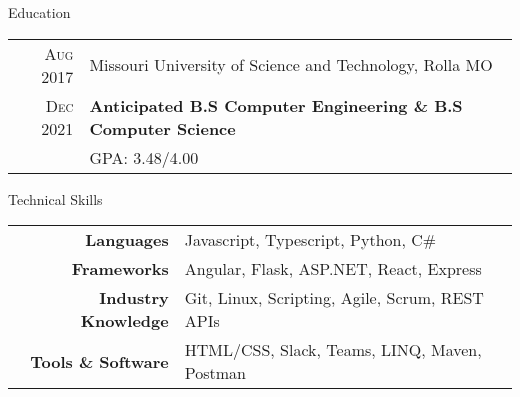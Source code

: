 \documentclass{resume}
\begin{document}

  
    
\begin{rSection}{Education}
  \small
  {
    \begin{tabular}{r|p{15cm}}
      \textsc{Aug} 2017 & Missouri University of Science and Technology, Rolla MO  \\ 
      \textsc{Dec} 2021 & \textbf{Anticipated B.S Computer Engineering \& B.S Computer Science} \\
      & GPA: 3.48/4.00 \\
    \end{tabular}
    }
\end{rSection}
      
\begin{rSection}{Technical Skills}
  \small
  {
      \begin{tabular}{rl}
      \multicolumn{1}{r|}{\textbf{Languages}} & Javascript, Typescript, Python, C\# \\
      \multicolumn{1}{r|}{\textbf{Frameworks}} & Angular, Flask, ASP.NET, React, Express \\
      \multicolumn{1}{r|}{\textbf{Industry Knowledge}} & Git, Linux, Scripting, Agile, Scrum, REST APIs \\
      \multicolumn{1}{r|}{\textbf{Tools \& Software}} & HTML/CSS, Slack, Teams, LINQ, Maven, Postman
      \end{tabular}
  }
\end{rSection}
\end{document}
